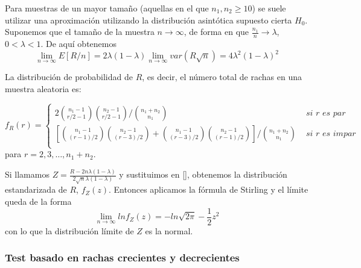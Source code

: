 	Para muestras de un mayor tamaño (aquellas en el que $n_1, n_2 \geq 10$) se suele utilizar una aproximación utilizando la distribución asintótica supuesto cierta $H_0$.\\
	Suponemos que el tamaño de la muestra $n \rightarrow \infty$, de forma en que $\frac{n_1}{n} \rightarrow \lambda$, $0<\lambda<1$. De aquí obtenemos
	\[ \lim\limits_{n \rightarrow \infty} E[R/n] = 
			2\lambda (1-\lambda) 
				\lim\limits_{n \rightarrow \infty} 
					var(R\sqrt{n}) =
			4\lambda^2(1-\lambda)^2
	\]
	
\begin{teorema}
	La distribución de probabilidad de $R$, es decir, el número total de rachas en una muestra aleatoria es:
	
	\begin{equation}
		f_R(r) = \left\lbrace\begin{array}{ll}
	2 {n_1-1 \choose r/2-1} {n_2-1 \choose r/2-1} 
		\bigg/ {n_1 + n_2 \choose n_1} &
			\textit{ si } r \textit{ es par} \\
	\left[
		{n_1-1 \choose (r-1)/2} {n_2-1 \choose (r-3)/2} +  
		{n_1-1 \choose (r-3)/2} {n_2-1 \choose (r-1)/2} 
	\right]
		\bigg/ {n_1 + n_2 \choose n_1} &
			\textit{ si } r \textit{ es impar} \\		
		\end{array}\right.
	\end{equation}
	para $r=2, 3, \dots, n_1 + n_2.$
\end{teorema}
	
	Si llamamos $Z = \frac{R - 2n\lambda (1-\lambda)}{2 \sqrt{n}\lambda (1-\lambda)}$ y sustituimos en [], obtenemos la distribución estandarizada de $R$, $f_Z(z)$. Entonces aplicamos la fórmula de Stirling y el límite queda de la forma
	\[ \lim\limits_{n \rightarrow \infty} ln f_Z(z)=
			-ln \sqrt{2\pi} - \frac{1}{2} z^2	\]
	con lo que la distribución límite de $Z$ es la normal. 
	
	
\subsubsection*{Test basado en rachas crecientes y decrecientes}	

